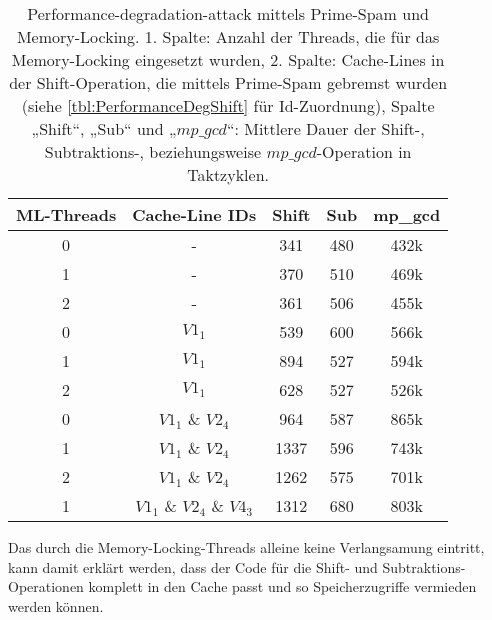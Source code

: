 \begin{table}[h]
\caption{Performance-degradation-attack mittels Prime-Spam und Memory-Locking. 1. Spalte: Anzahl der Threads, die für das Memory-Locking eingesetzt wurden, 2. Spalte: Cache-Lines in der Shift-Operation, die mittels Prime-Spam gebremst wurden (siehe \ref{tbl:PerformanceDegShift} für Id-Zuordnung), Spalte „Shift“, „Sub“ und „$mp\_gcd$“: Mittlere Dauer der Shift-, Subtraktions-, beziehungsweise $mp\_gcd$-Operation in Taktzyklen.}
\label{tbl:MemoryLockingResults}
\begin{tabular}{ccccc}
\toprule
ML-Threads & Cache-Line IDs     & Shift & Sub & mp\_gcd \\
\midrule
0                   & -               & 341   & 480 & 432k    \\
1                   & -               & 370   & 510 & 469k    \\
2                   & -               & 361   & 506 & 455k    \\
0                   & $V1_1$              & 539   & 600 & 566k    \\
1                   & $V1_1$              & 894   & 527 & 594k    \\
2                   & $V1_1$              & 628   & 527 & 526k    \\
0                   & $V1_1$ \& $V2_4$        & 964   & 587 & 865k    \\
1                   & $V1_1$ \& $V2_4$        & 1337  & 596 & 743k    \\
2                   & $V1_1$ \& $V2_4$        & 1262  & 575 & 701k    \\
1                   & $V1_1$ \& $V2_4$ \& $V4_3$ & 1312  & 680 & 803k   \\
\bottomrule
\end{tabular}
\end{table}

Das durch die Memory-Locking-Threads alleine keine Verlangsamung eintritt, kann damit erklärt werden, dass der Code für die Shift- und Subtraktions-Operationen komplett in den Cache passt und so Speicherzugriffe vermieden werden können.

